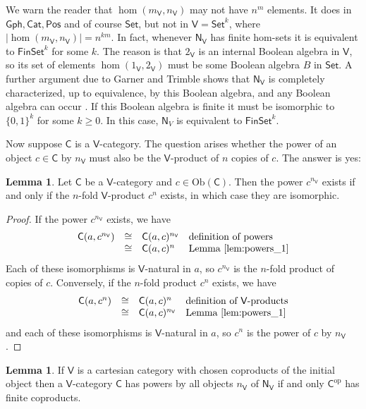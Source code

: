 \documentclass{amsart}
\theoremstyle{definition}
\newtheorem{lemma}[theorem]{Lemma}
\newcommand{\Gph}{\mathsf{Gph}}
\newcommand{\Set}{\mathsf{Set}}
\newcommand{\Cat}{\mathsf{Cat}}
\newcommand{\Pos}{\mathsf{Pos}}
\newcommand{\FinSet}{\mathsf{FinSet}}
\newcommand{\NN}{\mathsf{N}}
\newcommand{\V}{\mathsf{V}}
\newcommand{\C}{\mathsf{C}}
\newcommand{\op}{\mathrm{op}}
\newcommand{\Obj}{\mathrm{Ob}}
\begin{document}
We warn the reader that $\hom(m_\V,n_\V)$ may not have $n^m$ elements.  It does
in $\Gph,\Cat,\Pos$ and of course $\Set$, but not in $\V = \Set^k$, where
$|\hom(m_\V, n_\V)| = n^{km}$.    In fact, whenever $\NN_\V$ has finite hom-sets
it is equivalent to $\FinSet^k$ for some $k$.   The reason is that $2_\V$ is 
an internal Boolean algebra in $\V$, so its set of elements $\hom(1_\V,2_\V)$ 
must be some Boolean algebra $B$ in $\Set$.   A further argument due to Garner and Trimble shows that $\NN_\V$ is completely characterized, up to equivalence, by this Boolean algebra, and any Boolean algebra can occur \cite{nCafe}.   If this Boolean algebra is finite it must be isomorphic to $\{0,1\}^k$ for some $k \ge 0$.  In this case, $\NN_V$ is equivalent to $\FinSet^k$.

Now suppose $\C$ is a $\V$-category.   The question arises whether the
power of an object $c \in \C$ by $n_\V$ must also be the $\V$-product of $n$ copies
of $c$.   The answer is yes:

\begin{lemma}
\label{lem:powers_2}
Let $\C$ be a $\V$-category and $c \in \Obj(\C)$.  Then the power $c^{n_\V}$ exists
if and only if the $n$-fold $\V$-product $c^n$ exists, in which case they are isomorphic.
\end{lemma}

\begin{proof}
If the power $c^{n_\V}$ exists, we have
\[    
\begin{array}{rcll}
	 \C(a,c^{n_\V}) &\cong& \C(a,c)^{n_\V} & \text{definition of powers} \\
	 &\cong & \C(a,c)^n & \text{Lemma \ref{lem:powers_1}} \\
\end{array}
\]
Each of these isomorphisms is 
$\V$-natural in $a$, so $c^{n_\V}$ is the $n$-fold product of copies of $c$.  Conversely,
if the $n$-fold product $c^n$ exists, we have
\[    
\begin{array}{rcll}
	 \C(a,c^n) &\cong& \C(a,c)^n & \text{definition of $\V$-products} \\
	 &\cong & \C(a,c)^{n_\V} & \text{Lemma \ref{lem:powers_1}} \\
\end{array}
\]
and each of these isomorphisms is 
$\V$-natural in $a$, so $c^n$ is the power of $c$ by $n_\V$.
\end{proof}

\iffalse
\begin{lemma}
If $\V$ is a cartesian category with chosen coproducts of the initial object then a
$\V$-category $\C$ has powers by all objects $n_\V$ of $\NN_\V$ if and only $\C^\op$
has finite coproducts.
\end{lemma}
\end{document}
